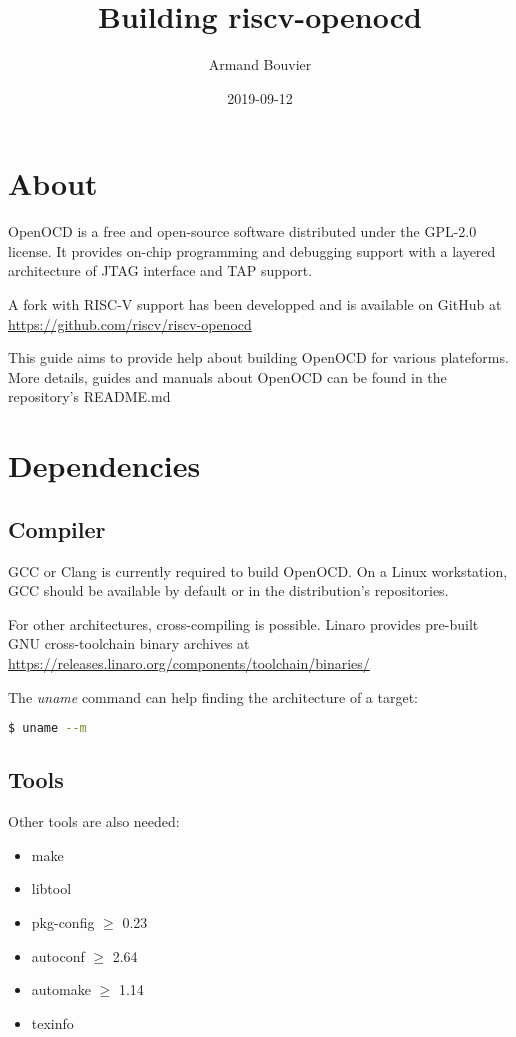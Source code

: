 \documentclass{article}
\title{Building riscv-openocd}
\date{2019-09-12}
\author{Armand Bouvier}
\begin{document}
	\maketitle
    
    \section{About}
    
    OpenOCD is a free and open-source software distributed under the GPL-2.0 license. It provides on-chip programming and debugging support with a layered architecture of JTAG interface and TAP support.
    
    A fork with RISC-V support has been developped and is available on GitHub at \url{https://github.com/riscv/riscv-openocd}
    
    This guide aims to provide help about building OpenOCD for various plateforms. More details, guides and manuals about OpenOCD can be found in the repository's README.md
    
    \section{Dependencies}
    
    \subsection{Compiler}
    
    GCC or Clang is currently required to build OpenOCD. On a Linux workstation, GCC should be available by default or in the distribution's repositories.
    
    For other architectures, cross-compiling is possible. Linaro provides pre-built GNU cross-toolchain binary archives at \url{https://releases.linaro.org/components/toolchain/binaries/}
    
    The \textit{uname} command can help finding the architecture of a target:
    
    \begin{lstlisting}[language=bash]
    $ uname --m
    \end{lstlisting}
    
    \subsection{Tools}
    
    Other tools are also needed:
    \begin{itemize}
    	\itemsep0em
    	\item make
    	\item libtool
    	\item pkg-config $\geqslant$ 0.23
    	\item autoconf $\geqslant$ 2.64
    	\item automake $\geqslant$ 1.14
    	\item texinfo
    \end{itemize}
    
\end{document}
